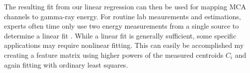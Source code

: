 The resulting fit from our linear regression can then be used for mapping
MCA channels to gamma-ray energy. For routine lab meaurements and estimations,
experts often time only use two energy measurements from a single source to determine a linear fit
\cite{gilmore_2011}. While a linear fit is generally sufficient, some
specific applications may require nonlinear fitting. This can easily be accomplished
my creating a feature matrix using higher powers of the measured centroids $C_i$ and
again fitting with ordinary least squares.
